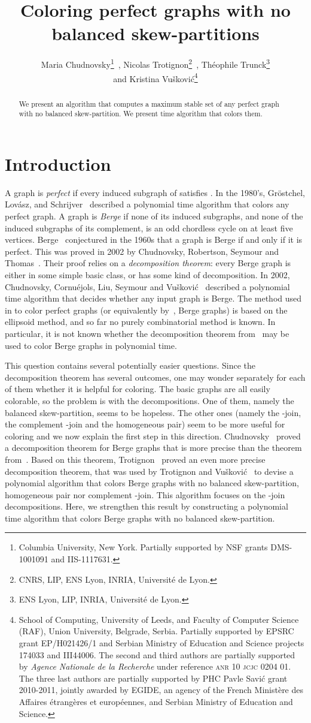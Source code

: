 \documentclass[11 pt] {article}
\title{Coloring perfect graphs with no balanced skew-partitions}
\author{Maria Chudnovsky\thanks{Columbia University, New
    York. Partially supported by NSF grants DMS-1001091 and
    IIS-1117631.}~, Nicolas Trotignon\thanks{CNRS, LIP, ENS Lyon,
    INRIA, Universit\'e de Lyon.}~, Th\'eophile Trunck\thanks{ENS Lyon,
    LIP, INRIA, Universit\'e de Lyon.}\\ and Kristina Vu\v
  skovi\'c\thanks{School of Computing, University of Leeds, and
    Faculty of Computer Science (RAF), Union University, Belgrade,
    Serbia.  Partially supported by EPSRC grant EP/H021426/1 and
    Serbian Ministry of Education and Science projects 174033 and
    III44006.  \newline The second and third authors are partially
    supported by \emph{Agence Nationale de la Recherche} under
    reference \textsc{anr 10 jcjc 0204 01}. The three last authors are
    partially supported by PHC Pavle Savi\'c grant 2010-2011, jointly
    awarded by EGIDE, an agency of the French Minist\`ere des Affaires
    \'etrang\`eres et europ\'eennes, and Serbian Ministry of Education
    and Science.}}
\begin{document}
\maketitle

\begin{abstract}
  We present an  algorithm that computes a maximum stable set
  of any perfect graph with no balanced skew-partition.  We present
   time algorithm that colors them.
\end{abstract}


\section{Introduction}

A graph  is \emph{perfect} if every induced subgraph  of 
satisfies .  In the 1980's, Gr\"ostchel,
Lov\'asz, and Schrijver~\cite{gls:color} described a polynomial time
algorithm that colors any perfect graph.  A graph is \emph{Berge} if
none of its induced subgraphs, and none of the induced subgraphs of its
complement, is an odd chordless cycle on at least five vertices.
Berge~\cite{berge:61} conjectured in the 1960s that a graph is Berge
if and only if it is perfect.  This was proved in 2002 by Chudnovsky,
Robertson, Seymour and Thomas~\cite{CRST}.  Their proof relies on a
\emph{decomposition theorem}: every Berge graph is either in some
simple basic class, or has some kind of decomposition.  In 2002,
Chudnovsky, Cornu\'ejols, Liu, Seymour and Vu\v
skovi\'c~\cite{chudnovsky.c.l.s.v:reco} described a polynomial time
algorithm that decides whether any input graph is Berge.  The method
used in \cite{gls:color} to color perfect graphs (or equivalently
by~\cite{CRST}, Berge graphs) is based on the ellipsoid method,
and so far no purely combinatorial method is known.  In particular, it
is not known whether the decomposition theorem from~\cite{CRST} may be
used to color Berge graphs in polynomial time.

This question contains several potentially easier questions.  Since
the decomposition theorem has several outcomes, one may wonder
separately for each of them whether it is helpful for coloring.  The
basic graphs are all easily colorable, so the problem is with the
decompositions.  One of them, namely the balanced skew-partition,
seems to be hopeless.  The other ones (namely the -join, the
complement -join and the homogeneous pair) seem to be more useful
for coloring and we now explain the first step in this direction.
Chudnovsky~\cite{thesis,trigraphs} proved a decomposition theorem for
Berge graphs that is more precise than the theorem from~\cite{CRST}.
Based on this theorem, Trotignon~\cite{nicolas:bsp} proved an even
more precise decomposition theorem, that was used by Trotignon and
Vu\v skovi\'c~\cite{nicolas.kristina:2-join} to devise a polynomial
algorithm that colors Berge graphs with no balanced skew-partition,
homogeneous pair nor complement -join.  This algorithm focuses on
the -join decompositions.  Here, we strengthen this result by
constructing a polynomial time algorithm that colors Berge graphs with
no balanced skew-partition.
\end{document}
